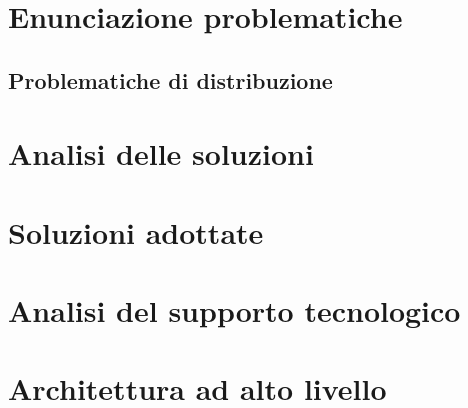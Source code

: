 \documentclass[a4paper]{article}
\begin{document}
\section{Enunciazione problematiche}
\label{enunciazione_problematiche}

\subsection{Problematiche di distribuzione}

\section{Analisi delle soluzioni}

\section{Soluzioni adottate}

\section{Analisi del supporto tecnologico}

\appendix
\section{Architettura ad alto livello}



\end{document}
